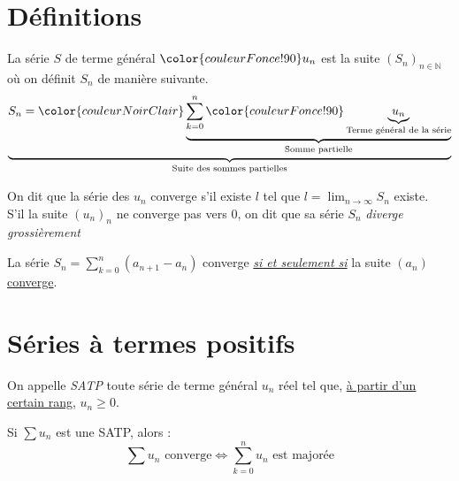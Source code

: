 \documentclass[11pt,a4paper,fleqn,pdftex]{report}
\begin{document}
\section{Définitions}
\begin{dfn}
La série $S$ de terme général $\color{couleurFonce!90} u_n$ est la suite $\left( S_n \right)_{n\in\mathbb{N}}$ où on définit $S_n$ de manière suivante.
    \[
    \underbrace{S_n = \color{couleurNoirClair} \underbrace{\sum_{k=0}^{n} \color{couleurFonce!90}\underbrace{u_n}_{\text{Terme général de la série}}}_{\text{Somme partielle}}}_{\text{Suite des sommes partielles}}
    \]
\end{dfn}

\begin{dfn}
    On dit que la série des $u_n$ converge s'il existe $l$ tel que $l = \lim_{n\to \infty} S_n$ existe.\\
    S'il la suite $(u_n)_n$ ne converge pas vers $0$, on dit que sa série $S_n$ \emph{diverge grossièrement}
\end{dfn}
\begin{itheorem}
    La série $S_n = \sum_{k=0}^n (a_{n+1}-a_n)$ converge \emph{\uline{si et seulement si}} la suite $(a_n)$ \uline{converge}.
\end{itheorem}
\section{Séries à termes positifs} %
\label{sec:SATP}
\begin{dfn}
    On appelle \emph{\acrfull{SATP}} toute série de terme général $u_n$ réel tel que, \uline{à partir d'un certain rang}, $u_n \ge 0$.
\end{dfn}
\begin{itheorem}
    Si $\sum u_n$ est une \gls{SATP}, alors :
    \begin{equation}
        \sum u_n \text{ converge} \Leftrightarrow \sum_{k=0}^n u_n \text{ est majorée}
    \end{equation}
\end{itheorem}
\end{document}
